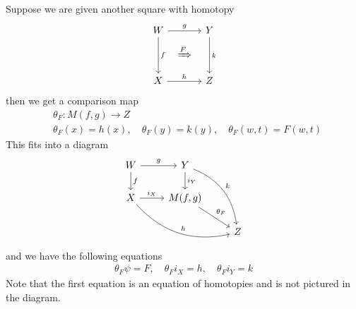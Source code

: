 \documentclass{scrartcl}
\let\emph\relax
\newcommand{\emphi}[1]{\index{#1}\emph{#1}}
\theoremstyle{plain}
\theoremstyle{definition}
\newtheorem{definition}[theorem]{Definition}
\DeclareMathOperator{\Hom}{Hom}
\begin{document}
Suppose we are given another square with homotopy
\begin{equation}\label{diag:square_with_homotopy}
    \begin{tikzcd}[column sep=.2cm, row sep=.2cm]
        W \arrow[rr,"g"]\arrow[dd,"f"] && Y \arrow[dd, "k"] \\
        & \xRightarrow{F} & \\
        X \arrow[rr, "h"] && Z
    \end{tikzcd}
\end{equation}
then we get a comparison map 
\begin{align*}
    &\theta_F\colon M(f,g)\to Z \\
    &\theta_F(x) = h(x), \quad \theta_F(y) = k(y), \quad \theta_F(w, t) = F(w, t)
\end{align*}
This fits into a diagram
\begin{equation}
    \begin{tikzcd}
    W \ar[r, "g"] \ar[d, "f"]  &  Y \ar[d, "i_Y"] \ar[ddr, bend left, "k"]  & \\
    X \ar[r, "i_X"] \ar[drr, bend right, "h"]  &  M(f, g) \ar[dr, "\theta_F"]  &  \\
    &  &  Z
\end{tikzcd}
\end{equation}
and we have the following equations
\begin{align*}
    \theta_F \psi = F, \quad \theta_F i_X = h, \quad \theta_F i_Y = k
\end{align*}
Note that the first equation is an equation of homotopies and is not pictured in the diagram. 

\end{document}
